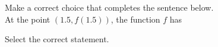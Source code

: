 \documentclass{ximera}
\begin{document}
\begin{question}
 Make a correct choice that completes the sentence below. \\
 
  At the point $(1.5,f(1.5))$, the  function $f$ has 

  \begin{multipleChoice}
  \end{multipleChoice}
  \end{question}
  \begin{question}
Select the correct statement.
  \begin{multipleChoice}
  \end{multipleChoice}
\end{question}
\end{document}
